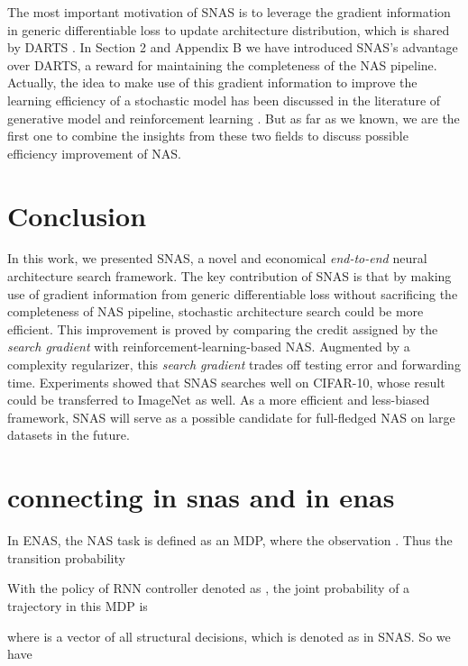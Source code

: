 \documentclass{article} \usepackage{iclr2019_conference,times}
\begin{document}
The most important motivation of SNAS is to leverage the gradient information in generic differentiable loss to update architecture distribution, which is shared by DARTS \citep{liu2018darts}. In Section 2 and Appendix B we have introduced SNAS's advantage over DARTS, a reward for maintaining the completeness of the NAS pipeline. Actually, the idea to make use of this gradient information to improve the learning efficiency of a stochastic model has been discussed in the literature of generative model \citep{gu2015muprop,maddison2016concrete} and reinforcement learning \citep{schmidhuber1990making, arjona2018rudder}. But as far as we known, we are the first one to combine the insights from these two fields to discuss possible efficiency improvement of NAS. 

\section{Conclusion}
In this work, we presented SNAS, a novel and economical \textit{end-to-end} neural architecture search framework. The key contribution of SNAS is that by making use of gradient information from generic differentiable loss without sacrificing the completeness of NAS pipeline, stochastic architecture search could be more efficient. This improvement is proved by comparing the credit assigned by the \textit{search gradient} with reinforcement-learning-based NAS. Augmented by a complexity regularizer, this \textit{search gradient} trades off testing error and forwarding time. Experiments showed that SNAS searches well on CIFAR-10, whose result could be transferred to ImageNet as well. As a more efficient and less-biased framework, SNAS will serve as a possible candidate for full-fledged NAS on large datasets in the future. 




\appendix
\section{connecting  in snas and  in enas}
In ENAS, the NAS task is defined as an MDP, where the observation . Thus the transition probability 

With the policy of RNN controller denoted as , the joint probability of a trajectory  in this MDP is

where  is a vector of all structural decisions, which is denoted as  in SNAS. So we have
\end{document}
